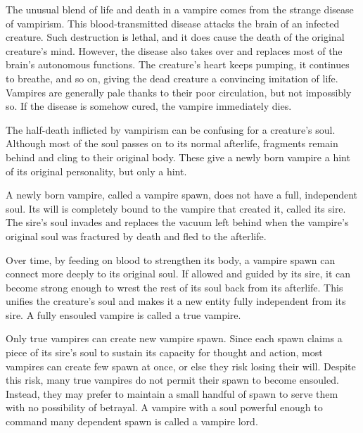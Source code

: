   The unusual blend of life and death in a vampire comes from the strange disease of vampirism.
  This blood-transmitted disease attacks the brain of an infected creature.
  Such destruction is lethal, and it does cause the death of the original creature's mind.
  However, the disease also takes over and replaces most of the brain's autonomous functions.
  The creature's heart keeps pumping, it continues to breathe, and so on, giving the dead creature a convincing imitation of life.
  Vampires are generally pale thanks to their poor circulation, but not impossibly so.
  If the disease is somehow cured, the vampire immediately dies.

  The half-death inflicted by vampirism can be confusing for a creature's soul.
  Although most of the soul passes on to its normal afterlife, fragments remain behind and cling to their original body.
  These give a newly born vampire a hint of its original personality, but only a hint.

  A newly born vampire, called a vampire spawn, does not have a full, independent soul.
  Its will is completely bound to the vampire that created it, called its sire.
  The sire's soul invades and replaces the vacuum left behind when the vampire's original soul was fractured by death and fled to the afterlife.

  Over time, by feeding on blood to strengthen its body, a vampire spawn can connect more deeply to its original soul.
  If allowed and guided by its sire, it can become strong enough to wrest the rest of its soul back from its afterlife.
  This unifies the creature's soul and makes it a new entity fully independent from its sire.
  A fully ensouled vampire is called a true vampire.

  Only true vampires can create new vampire spawn.
  Since each spawn claims a piece of its sire's soul to sustain its capacity for thought and action, most vampires can create few spawn at once, or else they risk losing their will.
  Despite this risk, many true vampires do not permit their spawn to become ensouled.
  Instead, they may prefer to maintain a small handful of spawn to serve them with no possibility of betrayal.
  A vampire with a soul powerful enough to command many dependent spawn is called a vampire lord.

